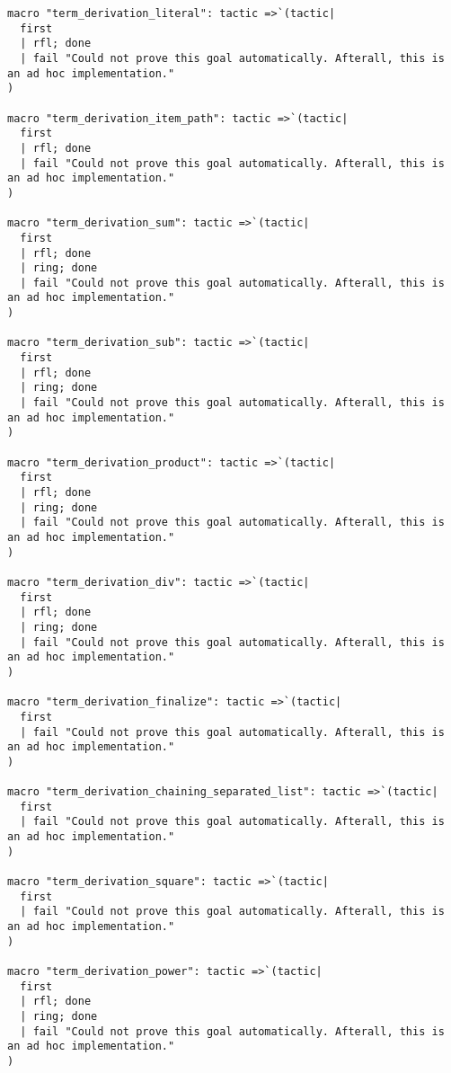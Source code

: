 \documentclass{article}
\begin{document}
\begin{tcolorbox}[colback=white!10, width=\linewidth]
\begin{lstlisting}[language=Lean4]
macro "term_derivation_literal": tactic =>`(tactic|
  first
  | rfl; done
  | fail "Could not prove this goal automatically. Afterall, this is an ad hoc implementation."
)

macro "term_derivation_item_path": tactic =>`(tactic|
  first
  | rfl; done
  | fail "Could not prove this goal automatically. Afterall, this is an ad hoc implementation."
)

macro "term_derivation_sum": tactic =>`(tactic|
  first
  | rfl; done
  | ring; done
  | fail "Could not prove this goal automatically. Afterall, this is an ad hoc implementation."
)

macro "term_derivation_sub": tactic =>`(tactic|
  first
  | rfl; done
  | ring; done
  | fail "Could not prove this goal automatically. Afterall, this is an ad hoc implementation."
)

macro "term_derivation_product": tactic =>`(tactic|
  first
  | rfl; done
  | ring; done
  | fail "Could not prove this goal automatically. Afterall, this is an ad hoc implementation."
)

macro "term_derivation_div": tactic =>`(tactic|
  first
  | rfl; done
  | ring; done
  | fail "Could not prove this goal automatically. Afterall, this is an ad hoc implementation."
)

macro "term_derivation_finalize": tactic =>`(tactic|
  first
  | fail "Could not prove this goal automatically. Afterall, this is an ad hoc implementation."
)

macro "term_derivation_chaining_separated_list": tactic =>`(tactic|
  first
  | fail "Could not prove this goal automatically. Afterall, this is an ad hoc implementation."
)

macro "term_derivation_square": tactic =>`(tactic|
  first
  | fail "Could not prove this goal automatically. Afterall, this is an ad hoc implementation."
)

macro "term_derivation_power": tactic =>`(tactic|
  first
  | rfl; done
  | ring; done
  | fail "Could not prove this goal automatically. Afterall, this is an ad hoc implementation."
)


\end{lstlisting}
\end{tcolorbox}
\end{document}
